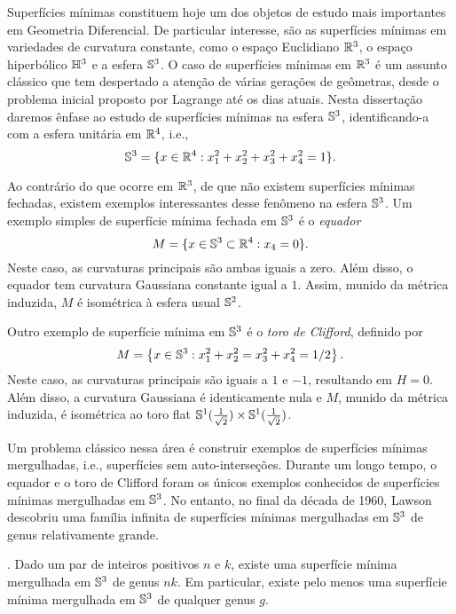 Superf\'icies m\'inimas constituem hoje um dos objetos de estudo
mais importantes em Geometria Diferencial. De particular interesse, 
s\~ao as superf\'icies m\'inimas em variedades de curvatura constante, 
como o espa\c co Euclidiano $\mathbb{R}^3$, o espa\c co hiperb\'olico $\mathbb{H}^3$
e a esfera $\mathbb{S}^3$. O caso de superf\'icies m\'inimas em $\mathbb{R}^3$ \'e um
assunto cl\'assico que tem despertado a aten\c c\~ao de v\'arias 
gera\c c\~oes de ge\^ometras, desde o problema inicial proposto por 
Lagrange at\'e os dias atuais. Nesta disserta\c c\~ao daremos
\^enfase ao estudo de superf\'icies m\'inimas na esfera $\mathbb{S}^3$, 
identificando-a com a esfera unit\'aria em $\mathbb{R}^4$, i.e.,
\[
\mathbb{S}^3=\{x\in\mathbb{R}^4:x_1^2+x_2^2+x_3^2+x_4^2=1\}.
\]



Ao contr\'ario do que ocorre em $\mathbb{R}^3$, de que n\~ao existem 
superf\'icies m\'inimas fechadas, existem exemplos interessantes
desse fen\^omeno na esfera $\mathbb{S}^3$. Um exemplo simples de 
superf\'icie m\'inima fechada em $\mathbb{S}^3$ \'e o {\em equador}
\[
M=\{x\in\mathbb{S}^3\subset\mathbb{R}^4:x_4=0\}.
\]
Neste caso, as curvaturas principais s\~ao ambas iguais a zero. 
Al\'em disso, o equador tem curvatura Gaussiana
constante igual a $1$. Assim, munido da m\'etrica induzida, $M$ \'e
isom\'etrica \`a esfera usual $\mathbb{S}^2$.

Outro exemplo de superf\'icie m\'inima em $\mathbb{S}^3$ \'e o {\em toro de
	Clifford}, definido por
\[
M=\left\{x\in\mathbb{S}^3:x_1^2+x_2^2=x_3^2+x_4^2=1/2\right\}.
\]
Neste caso, as curvaturas principais s\~ao iguais a $1$ e $-1$, 
resultando em $H=0$. Al\'em disso, a curvatura Gaussiana \'e 
identicamente nula e $M$, munido da m\'etrica induzida, \'e 
isom\'etrica ao toro flat 
$\mathbb{S}^1(\frac{1}{\sqrt2})\times\mathbb{S}^1(\frac{1}{\sqrt2})$.

Um problema cl\'assico nessa \'area \'e construir exemplos
de superf\'icies m\'inimas mergulhadas, i.e., superf\'icies sem 
auto-interse\c c\~oes. Durante um longo tempo, o equador e 
o toro de Clifford foram os \'unicos exemplos conhecidos de 
superf\'icies m\'inimas mergulhadas em $\mathbb{S}^3$. No entanto, 
no final da d\'ecada de 1960, Lawson \cite{Lawson1970} 
descobriu uma fam\'ilia infinita de superf\'icies m\'inimas 
mergulhadas em $\mathbb{S}^3$ de genus relativamente grande.

\begin{teorema}\label{teo:lawson}
	\cite{Lawson1970}. Dado um par de inteiros positivos $n$ e $k$, existe uma superf\'icie
	m\'inima mergulhada em $\mathbb{S}^3$ de genus $nk$. Em particular, 
	existe pelo menos uma superf\'icie m\'inima mergulhada em $\mathbb{S}^3$
	de qualquer genus $g$.
\end{teorema}

